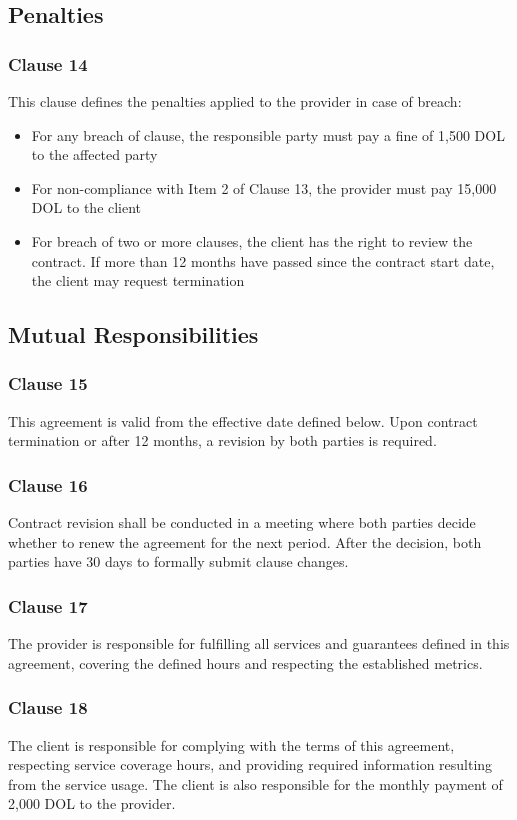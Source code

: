 \subsection{Penalties}
\subsubsection*{Clause 14}
This clause defines the penalties applied to the provider in case of breach:
\begin{itemize}
  \item For any breach of clause, the responsible party must pay a fine of 1,500 DOL to the affected party
  \item For non-compliance with Item 2 of Clause 13, the provider must pay 15,000 DOL to the client
  \item For breach of two or more clauses, the client has the right to review the contract. If more than 12 months have passed since the contract start date, the client may request termination
\end{itemize}

\subsection{Mutual Responsibilities}
\subsubsection*{Clause 15}
This agreement is valid from the effective date defined below. Upon contract termination or after 12 months, a revision by both parties is required.

\subsubsection*{Clause 16}
Contract revision shall be conducted in a meeting where both parties decide whether to renew the agreement for the next period. After the decision, both parties have 30 days to formally submit clause changes.

\subsubsection*{Clause 17}
The provider is responsible for fulfilling all services and guarantees defined in this agreement, covering the defined hours and respecting the established metrics.

\subsubsection*{Clause 18}
The client is responsible for complying with the terms of this agreement, respecting service coverage hours, and providing required information resulting from the service usage. The client is also responsible for the monthly payment of 2,000 DOL to the provider.

